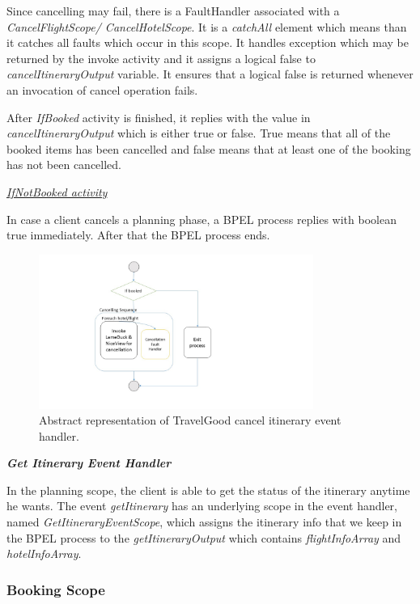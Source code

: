 Since cancelling may fail, there is a FaultHandler associated with a \textit{CancelFlightScope/ CancelHotelScope}. It is a \textit{catchAll} element which means than it catches all faults which occur in this scope. It handles exception which may be returned by the invoke activity and it assigns a logical false to \textit{cancelItineraryOutput} variable. It ensures that a logical false is returned whenever an invocation of cancel operation fails. 

After \textit{IfBooked} activity is finished, it replies with the value in \textit{cancelItineraryOutput} which is either true or false. True means that all of the booked items has been cancelled and false means that at least one of the booking has not been cancelled.

\underline{\textit{IfNotBooked activity}}

In case a client cancels a planning phase, a BPEL process replies with boolean true immediately. After that the BPEL process ends.

\begin{figure}[H]
\centering
\includegraphics[width=0.8\textwidth]{images/bpel_cancel_abstract_impl.jpg}
\caption{Abstract representation of TravelGood cancel itinerary event handler.} \label{fig:abstract-cancel}
\label{statediagram}
\end{figure}

\textbf{\textit{Get Itinerary Event Handler}}

In the planning scope, the client is able to get the status of the itinerary anytime he wants. The event \textit{getItinerary} has an underlying scope in the event handler, named \textit{GetItineraryEventScope}, which assigns the itinerary info that we keep in the BPEL process to the \textit{getItineraryOutput} which contains \textit{flightInfoArray} and \textit{hotelInfoArray}.

\subsubsection*{Booking Scope}

